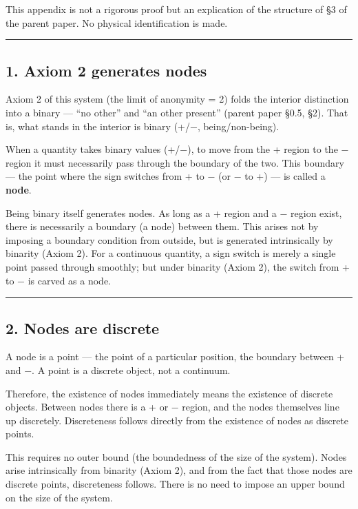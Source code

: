 \documentclass[11pt]{ltjsarticle}
\begin{document}
This appendix is not a rigorous proof but an explication of the
structure of §3 of the parent paper. No physical identification is made.

\begin{center}\rule{0.5\linewidth}{0.5pt}\end{center}

\subsection{1. Axiom 2 generates nodes}\label{axiom-2-generates-nodes}

Axiom 2 of this system (the limit of anonymity = 2) folds the interior
distinction into a binary --- ``no other'' and ``an other present''
(parent paper §0.5, §2). That is, what stands in the interior is binary
(+/−, being/non-being).

When a quantity takes binary values (+/−), to move from the + region to
the − region it must necessarily pass through the boundary of the two.
This boundary --- the point where the sign switches from + to − (or − to
+) --- is called a \textbf{node}.

Being binary itself generates nodes. As long as a + region and a −
region exist, there is necessarily a boundary (a node) between them.
This arises not by imposing a boundary condition from outside, but is
generated intrinsically by binarity (Axiom 2). For a continuous
quantity, a sign switch is merely a single point passed through
smoothly; but under binarity (Axiom 2), the switch from + to − is carved
as a node.

\begin{center}\rule{0.5\linewidth}{0.5pt}\end{center}

\subsection{2. Nodes are discrete}\label{nodes-are-discrete}

A node is a point --- the point of a particular position, the boundary
between + and −. A point is a discrete object, not a continuum.

Therefore, the existence of nodes immediately means the existence of
discrete objects. Between nodes there is a + or − region, and the nodes
themselves line up discretely. Discreteness follows directly from the
existence of nodes as discrete points.

This requires no outer bound (the boundedness of the size of the
system). Nodes arise intrinsically from binarity (Axiom 2), and from the
fact that those nodes are discrete points, discreteness follows. There
is no need to impose an upper bound on the size of the system.
\end{document}
